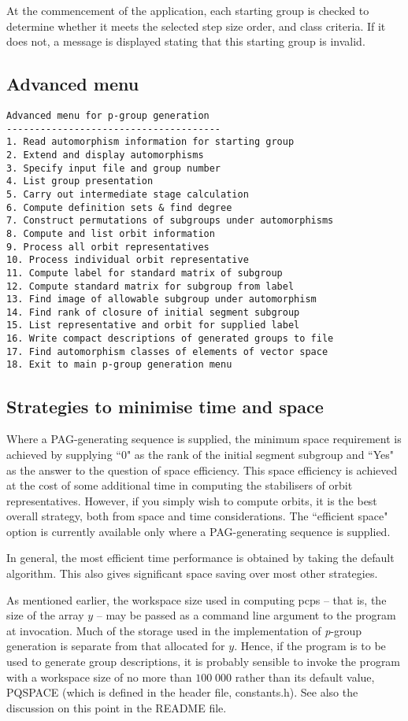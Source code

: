 At the commencement of the application, each starting group
is checked to determine whether it meets the selected step size
order, and class criteria. If it does not, a message is displayed 
stating that this starting group is invalid. 

\subsection{Advanced menu}
\begin{verbatim}
Advanced menu for p-group generation
--------------------------------------
1. Read automorphism information for starting group
2. Extend and display automorphisms
3. Specify input file and group number
4. List group presentation
5. Carry out intermediate stage calculation
6. Compute definition sets & find degree
7. Construct permutations of subgroups under automorphisms
8. Compute and list orbit information
9. Process all orbit representatives
10. Process individual orbit representative
11. Compute label for standard matrix of subgroup
12. Compute standard matrix for subgroup from label
13. Find image of allowable subgroup under automorphism
14. Find rank of closure of initial segment subgroup
15. List representative and orbit for supplied label
16. Write compact descriptions of generated groups to file
17. Find automorphism classes of elements of vector space
18. Exit to main p-group generation menu
\end{verbatim}

\subsection{Strategies to minimise time and space} 
Where a PAG-generating sequence is supplied, the minimum space 
requirement is achieved by supplying ``0" as the rank of the 
initial segment subgroup and ``Yes" as the answer to the question 
of space efficiency. 
This space efficiency is achieved at the cost of some additional
time in computing the stabilisers of orbit representatives.
However, if you simply wish to compute orbits, it is the 
best overall strategy, both from space and time considerations.
The ``efficient space" option is currently available only 
where a PAG-generating sequence is supplied. 

In general, the most efficient time performance is obtained by 
taking the default algorithm. This also gives significant space 
saving over most other strategies. 

As mentioned earlier, the workspace size used in computing pcps -- 
that is, the size of the array $y$ -- may be passed as a command 
line argument to the program at invocation. Much of the storage used in the 
implementation of {\it p}-group generation is separate from that 
allocated for $y$. Hence, if the program is to be used to 
generate group descriptions, it is probably sensible 
to invoke the program with a workspace size of no more than 
$100\;000$ rather than its default value, PQSPACE 
(which is defined in the header file, constants.h).
See also the discussion on this point in the README file.
